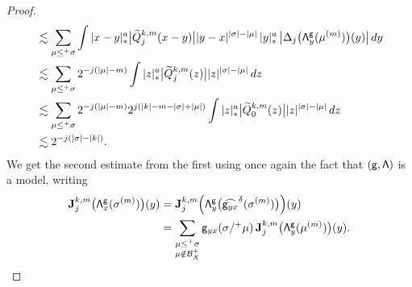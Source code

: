\documentclass[11pt]{article}
\numberwithin{equation}{section}
\theoremstyle{plain}
\theoremstyle{definition}
\newcommand{\bfJ}{\mathbf{J}}
\newcommand{\sfg}{\mathsf{g}}
\newcommand{\mcB}{\mathcal{B}}
\begin{document}
\begin{proof}
\begin{align*}
&\lesssim\sum_{\mu\le^+\sigma}\int |x-y|_*^a \big|\widetilde{Q}_j^{k,m}(x-y)\big| |y-x|^{|\sigma|-|\mu|}\,|y|_*^a\,\big|\Delta_j\bigl({\sf\Lambda}^{\sfg}_y(\mu^{(m)})\bigr)(y)\big|\,dy \\
&\lesssim\sum_{\mu\le^+\sigma}2^{-j(|\mu|-m)} \int |z|_*^a\big|\widetilde{Q}_j^{k,m}(z)\big| |z|^{|\sigma|-|\mu|}\,dz \\
&\lesssim\sum_{\mu\le^+\sigma}2^{-j(|\mu|-m)}2^{j(|k|-m-|\sigma|+|\mu|)} \int |z|_*^a\big|\widetilde{Q}_0^{k,m}(z)\big| |z|^{|\sigma|-|\mu|}\,dz \\
&\lesssim2^{-j(|\sigma|-|k|)}.
\end{align*}
We get the second estimate from the first using once again the fact that ${\sf (g,\Lambda)}$ is a model, writing
\begin{align*}
\bfJ_j^{k,m}\bigl({\sf\Lambda}^{\sfg}_x(\sigma^{(m)})\bigr)(y) &= \bfJ_j^{k,m}\Bigl({\sf\Lambda}^{\sfg}_y\bigl(\widehat{{\sf g}_{yx}}^\delta (\sigma^{(m)})\bigr)\Bigr)(y)\\
&= \sum_{\substack{\mu\le^+\sigma\\\mu\notin\mcB_X^+}}\sfg_{yx}(\sigma/^+\mu)\,\bfJ_j^{k,m}\bigl({\sf\Lambda}^{\sfg}_y(\mu^{(m)})\bigr)(y).\qedhere
\end{align*}
\end{proof}
\end{document}
